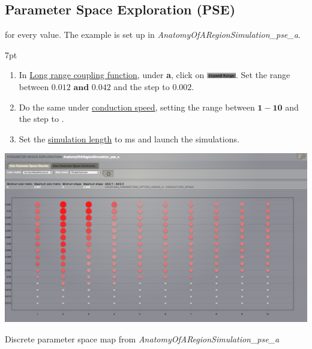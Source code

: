 \documentclass{tufte-handout}
\newenvironment{simulation}{%
  \def\FrameCommand{%
    \hspace{1pt}%
    {\color{ForestGreen}\vrule width 2pt}%
    {\color{simulationshade}\vrule width 4pt}%
    \colorbox{simulationshade}%
  }%
  \MakeFramed{\advance\hsize-\width\FrameRestore}%
  \noindent\hspace{-4.55pt}%
  \begin{adjustwidth}{}{7pt}%
  \vspace{2pt}\vspace{2pt}%
}
{%
  \vspace{2pt}\end{adjustwidth}\endMakeFramed%
}
\begin{document}
 \newpage
\subsection{Parameter Space Exploration (PSE)}\label{sec:pse}

 for
every value.  The example is set up in \textit{AnatomyOfARegionSimulation\_pse\_a}. 

\begin{simulation}
\begin{enumerate}
 \item In \underline{Long range coupling function}, under \textbf{a}, click on \includegraphics[width=0.1\textwidth]{butt_expand_range.png}. 
 Set the range between $\mathbf{0.012 \text{ and } 0.042}$ and the step to $\mathbf{0.002}$.
 \item Do the same under \underline{conduction speed}, setting the range between $\mathbf{1-10}$  and the step to \textbf{}.
 
 \item Set the \underline{simulation length} to \unit[2000]{ms} and launch the simulations.
\end{enumerate}
\end{simulation}

\begin{marginfigure}
  \includegraphics[width=\linewidth]{Handout_UI_BuildingYourOwnBrainNetworkModel_PSEDiscrete}%
  \caption{Discrete parameter space map from \textit{AnatomyOfARegionSimulation\_pse\_a}}%
  \label{fig:pse_discrete}%
\end{marginfigure}
\end{document}
